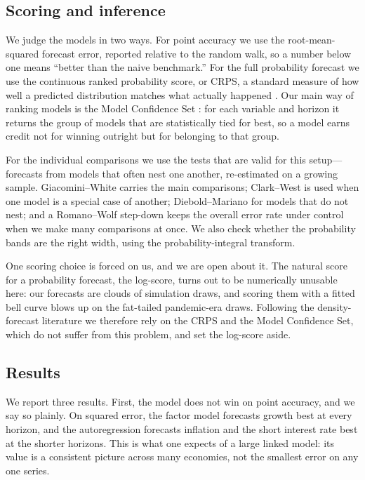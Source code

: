 \documentclass[11pt]{article}
\begin{document}
\subsection{Scoring and inference}
\label{sub:eval-scoring}

We judge the models in two ways. For point accuracy we use the root-mean-squared forecast error, reported
relative to the random walk, so a number below one means ``better than the naive benchmark.'' For the full
probability forecast we use the continuous ranked probability score, or CRPS, a standard measure of how
well a predicted distribution matches what actually happened \citep{GneitingRaftery2007}. Our main way of
ranking models is the Model Confidence Set \citep{HansenLundeNason2011}: for each variable and horizon it
returns the group of models that are statistically tied for best, so a model earns credit not for winning
outright but for belonging to that group.

For the individual comparisons we use the tests that are valid for this setup---forecasts from models that
often nest one another, re-estimated on a growing sample. Giacomini--White \citep{GiacominiWhite2006}
carries the main comparisons; Clark--West \citep{ClarkWest2007} is used when one model is a special case of
another; Diebold--Mariano \citep{DieboldMariano1995,HarveyLeybourneNewbold1997} for models that do not nest;
and a Romano--Wolf step-down \citep{RomanoWolf2005} keeps the overall error rate under control when we make
many comparisons at once. We also check whether the probability bands are the right width, using the
probability-integral transform.

One scoring choice is forced on us, and we are open about it. The natural score for a probability
forecast, the log-score, turns out to be numerically unusable here: our forecasts are clouds of
simulation draws, and scoring them with a fitted bell curve blows up on the fat-tailed pandemic-era draws.
Following the density-forecast literature \citep{AmisanoGiacomini2007} we therefore rely on the CRPS and
the Model Confidence Set, which do not suffer from this problem, and set the log-score aside.

\subsection{Results}
\label{sub:eval-results}

We report three results. First, the model does not win on point accuracy, and we say so plainly. On
squared error, the factor model forecasts growth best at every horizon, and the autoregression forecasts
inflation and the short interest rate best at the shorter horizons. This is what one expects of a large
linked model: its value is a consistent picture across many economies, not the smallest error on any one
series.
\end{document}
